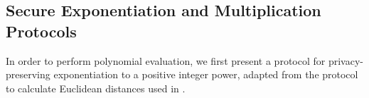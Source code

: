 

\subsection{Secure Exponentiation and Multiplication Protocols}
\label{ssec:exponentiationprotocol}
In order to perform polynomial evaluation, we first present a protocol for privacy-preserving exponentiation to a positive integer power, adapted from the protocol to calculate Euclidean distances used in \cite{hutchison_privacy-preserving_2009}.


